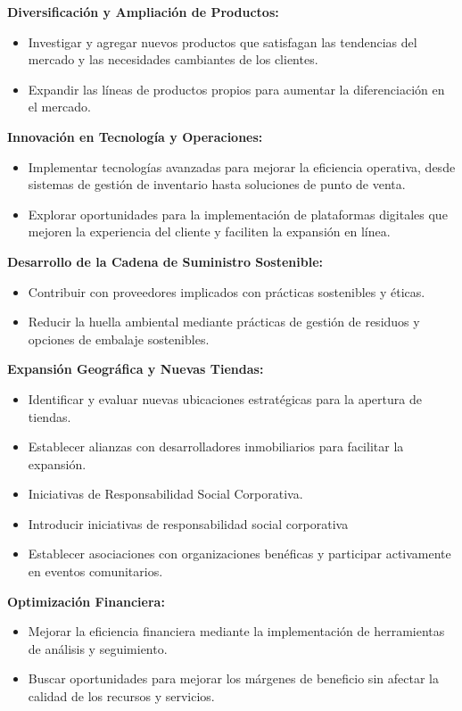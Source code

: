 \textbf{Diversificación y Ampliación de Productos:}
\begin{itemize}
	\item Investigar y agregar nuevos productos que satisfagan las tendencias del mercado y las necesidades cambiantes de los clientes.
	\item Expandir las líneas de productos propios para aumentar la diferenciación en el mercado.
\end{itemize}

\textbf{Innovación en Tecnología y Operaciones:}
\begin{itemize}
	\item Implementar tecnologías avanzadas para mejorar la eficiencia operativa, desde sistemas de gestión de inventario hasta soluciones de punto de venta.
	\item Explorar oportunidades para la implementación de plataformas digitales que mejoren la experiencia del cliente y faciliten la expansión en línea.
\end{itemize}

\textbf{Desarrollo de la Cadena de Suministro Sostenible:}
\begin{itemize}
	\item Contribuir con proveedores implicados con prácticas sostenibles y éticas.
	\item Reducir la huella ambiental mediante prácticas de gestión de residuos y opciones de embalaje sostenibles.
\end{itemize}

\textbf{Expansión Geográfica y Nuevas Tiendas:}
\begin{itemize}
	\item Identificar y evaluar nuevas ubicaciones estratégicas para la apertura de tiendas.
	\item Establecer alianzas con desarrolladores inmobiliarios para facilitar la expansión.
	\item Iniciativas de Responsabilidad Social Corporativa.
	\item Introducir iniciativas de responsabilidad social corporativa  
	\item Establecer asociaciones con organizaciones benéficas y participar activamente en eventos comunitarios.
\end{itemize}

\textbf{Optimización Financiera:}
\begin{itemize}
	\item Mejorar la eficiencia financiera mediante la implementación de herramientas de análisis y seguimiento.
	\item Buscar oportunidades para mejorar los márgenes de beneficio sin afectar la calidad de los recursos y servicios.
\end{itemize}

